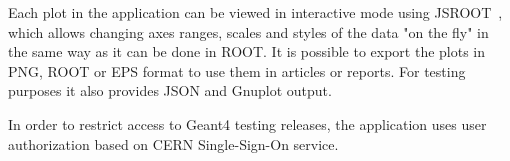 Each plot in the application can be viewed in interactive mode using JSROOT~\cite{JSROOT}, which allows changing axes ranges, scales and styles of the data "on the fly" in the same way as it can be done in ROOT. It is possible to export the plots in PNG, ROOT or EPS format to use them in articles or reports. For testing purposes it also provides JSON and Gnuplot output.

In order to restrict access to Geant4 testing releases, the application uses user authorization based on CERN Single-Sign-On service.





